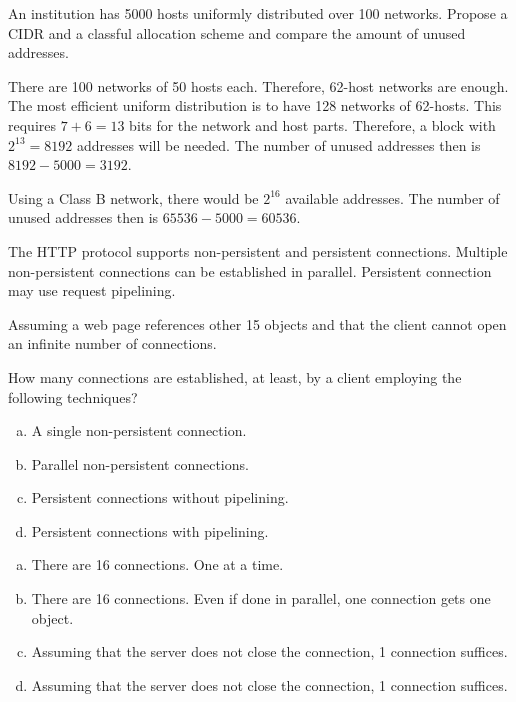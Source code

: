 \begin{Exercise}
An institution has 5000 hosts uniformly distributed over 100 networks.
Propose a CIDR and a classful allocation scheme and compare the amount of unused addresses.
\end{Exercise}
\begin{Answer}
There are 100 networks of 50 hosts each. Therefore, 62-host networks are enough.
The most efficient uniform distribution is to have 128 networks of 62-hosts.
This requires \(7 + 6 = 13\) bits for the network and host parts.
Therefore, a block with \(2^{13} = 8192\) addresses will be needed.
The number of unused addresses then is \(8192 - 5000 = 3192\).

Using a Class B network, there would be \(2^{16}\) available addresses.
The number of unused addresses then is \(65536 - 5000 = 60536\).
\end{Answer}

\begin{Exercise}
The HTTP protocol supports non-persistent and persistent connections.
Multiple non-persistent connections can be established in parallel.
Persistent connection may use request pipelining.

Assuming a web page references other 15 objects and that the client cannot open an infinite number of connections.

How many connections are established, at least, by a client employing the following techniques?

\begin{enumerate}[a)]
\item A single non-persistent connection.
\item Parallel non-persistent connections.
\item Persistent connections without pipelining.
\item Persistent connections with pipelining.
\end{enumerate}
\end{Exercise}
\begin{Answer}
\begin{enumerate}[a)]
\item There are 16 connections. One at a time.
\item There are 16 connections. Even if done in parallel, one connection gets one object.
\item Assuming that the server does not close the connection, 1 connection suffices.
\item Assuming that the server does not close the connection, 1 connection suffices.
\end{enumerate}

\end{Answer}

